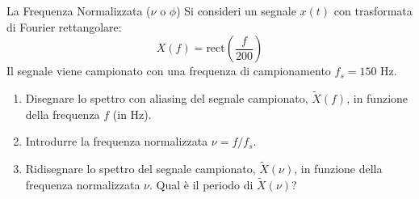 
\begin{esercizio}{La Frequenza Normalizzata ($\nu$ o $\phi$)}
    Si consideri un segnale $x(t)$ con trasformata di Fourier rettangolare:
    \[
        X(f) = \text{rect}\left(\frac{f}{200}\right)
    \]
    Il segnale viene campionato con una frequenza di campionamento $f_s = 150$ Hz.
    
    \begin{enumerate}
        \item Disegnare lo spettro con aliasing del segnale campionato, $\tilde{X}(f)$, in funzione della frequenza $f$ (in Hz).
        \item Introdurre la frequenza normalizzata $\nu = f/f_s$.
        \item Ridisegnare lo spettro del segnale campionato, $\tilde{X}(\nu)$, in funzione della frequenza normalizzata $\nu$. Qual è il periodo di $\tilde{X}(\nu)$?
    \end{enumerate}
\end{esercizio}